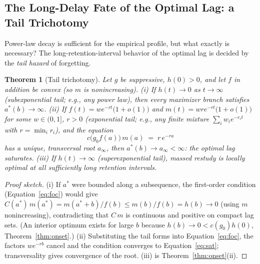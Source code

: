 \documentclass[man, 12pt, floatsintext]{apa6}
\newtheorem{theorem}{Theorem}
\theoremstyle{definition}
\theoremstyle{remark}
\begin{document}
\subsection{The Long-Delay Fate of the Optimal Lag: a Tail Trichotomy}

Power-law decay is sufficient for the empirical profile, but what exactly is necessary? The long-retention-interval behavior of the optimal lag is decided by the \emph{tail hazard} of forgetting.

\begin{theorem}[Tail trichotomy]\label{thm:tails}
Let $g$ be suppressive, $h(0)>0$, and let $f$ in addition be convex (so $m$ is nonincreasing).
(i) If $h(t) \to 0$ as $t \to \infty$ (subexponential tail; e.g., any power law), then every maximizer branch satisfies $a^*(b) \to \infty$.
(ii) If $f(t) = w e^{-r t}\big(1+o(1)\big)$ and $m(t) = w r e^{-r t}\big(1+o(1)\big)$ for some $w \in (0,1]$, $r>0$ (exponential tail; e.g., any finite mixture $\sum_i w_i e^{-r_i t}$ with $r = \min_i r_i$), and the equation
\begin{equation}\label{eq:sat}
  c\big(g_0 f(a)\big)\, m(a) \;=\; r\, e^{-r a}
\end{equation}
has a unique, transversal root $a_\infty$, then $a^*(b) \to a_\infty < \infty$: the optimal lag \emph{saturates}.
(iii) If $h(t) \to \infty$ (superexponential tail), massed restudy is locally optimal at all sufficiently long retention intervals.
\end{theorem}

\begin{proof}[Proof sketch]
(i) If $a^*$ were bounded along a subsequence, the first-order condition (Equation~\ref{eq:foc}) would give $C(a^*)\, m(a^*) = m(a^*+b)/f(b) \leq m(b)/f(b) = h(b) \to 0$ (using $m$ nonincreasing), contradicting that $C\,m$ is continuous and positive on compact lag sets. (An interior optimum exists for large $b$ because $h(b)\to 0 < c(g_0)h(0)$, Theorem~\ref{thm:onset}.)
(ii) Substituting the tail forms into Equation~\ref{eq:foc}, the factors $w e^{-rb}$ cancel and the condition converges to Equation~\ref{eq:sat}; transversality gives convergence of the root.
(iii) is Theorem~\ref{thm:onset}(ii).
\end{proof}
\end{document}

